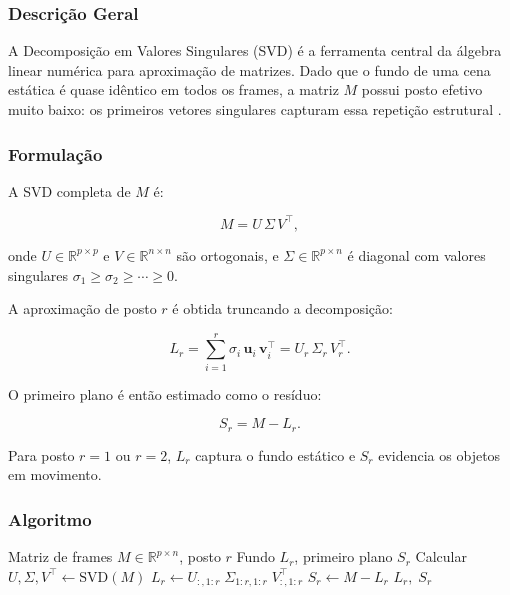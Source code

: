\documentclass[12pt, a4paper]{article}
\begin{document}
\subsubsection{Descrição Geral}

A Decomposição em Valores Singulares (SVD) é a ferramenta central da álgebra
linear numérica para aproximação de matrizes. Dado que o fundo de uma cena estática
é quase idêntico em todos os frames, a matriz $M$ possui posto efetivo muito baixo:
os primeiros vetores singulares capturam essa repetição estrutural
\cite{trefethen1997numerical, golub2013matrix}.

\subsubsection{Formulação}

A SVD completa de $M$ é:

\begin{equation}
  M = U\,\Sigma\,V^\top,
  \label{eq:svd}
\end{equation}

onde $U \in \mathbb{R}^{p \times p}$ e $V \in \mathbb{R}^{n \times n}$ são
ortogonais, e $\Sigma \in \mathbb{R}^{p \times n}$ é diagonal com valores
singulares $\sigma_1 \geq \sigma_2 \geq \cdots \geq 0$.

A aproximação de posto $r$ é obtida truncando a decomposição:

\begin{equation}
  L_r = \sum_{i=1}^{r} \sigma_i\,\mathbf{u}_i\,\mathbf{v}_i^\top
      = U_r\,\Sigma_r\,V_r^\top.
  \label{eq:svd_rank}
\end{equation}

O primeiro plano é então estimado como o resíduo:

\begin{equation}
  S_r = M - L_r.
  \label{eq:svd_fg}
\end{equation}

Para posto $r = 1$ ou $r = 2$, $L_r$ captura o fundo estático e $S_r$ evidencia
os objetos em movimento.

\subsubsection{Algoritmo}

\begin{algorithm}[H]
\caption{SVD de Baixo Posto para Remoção de Fundo}
\label{alg:svd}
\begin{algorithmic}[1]
  \Require Matriz de frames $M \in \mathbb{R}^{p \times n}$, posto $r$
  \Ensure Fundo $L_r$, primeiro plano $S_r$
  \State Calcular $U, \Sigma, V^\top \leftarrow \mathrm{SVD}(M)$
  \State $L_r \leftarrow U_{:,1:r}\;\Sigma_{1:r,1:r}\;V_{:,1:r}^\top$
  \State $S_r \leftarrow M - L_r$
  \Return $L_r,\; S_r$
\end{algorithmic}
\end{algorithm}
\end{document}
